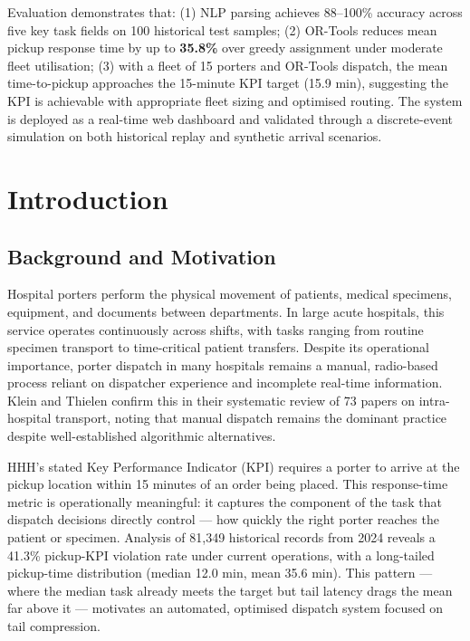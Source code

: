 \documentclass[12pt,a4paper]{article}
\begin{document}
Evaluation demonstrates that: (1) NLP parsing achieves 88--100\% accuracy across five key task fields on 100 historical test samples; (2) OR-Tools reduces mean pickup response time by up to \textbf{35.8\%} over greedy assignment under moderate fleet utilisation; (3) with a fleet of 15 porters and OR-Tools dispatch, the mean time-to-pickup approaches the 15-minute KPI target (15.9 min), suggesting the KPI is achievable with appropriate fleet sizing and optimised routing. The system is deployed as a real-time web dashboard and validated through a discrete-event simulation on both historical replay and synthetic arrival scenarios.

\newpage
\tableofcontents
\newpage

\section{Introduction}

\subsection{Background and Motivation}

Hospital porters perform the physical movement of patients, medical specimens, equipment, and documents between departments. In large acute hospitals, this service operates continuously across shifts, with tasks ranging from routine specimen transport to time-critical patient transfers. Despite its operational importance, porter dispatch in many hospitals remains a manual, radio-based process reliant on dispatcher experience and incomplete real-time information. Klein and Thielen \cite{klein2025} confirm this in their systematic review of 73 papers on intra-hospital transport, noting that manual dispatch remains the dominant practice despite well-established algorithmic alternatives.

HHH's stated Key Performance Indicator (KPI) requires a porter to arrive at the pickup location within 15 minutes of an order being placed. This response-time metric is operationally meaningful: it captures the component of the task that dispatch decisions directly control --- how quickly the right porter reaches the patient or specimen. Analysis of 81,349 historical records from 2024 reveals a 41.3\% pickup-KPI violation rate under current operations, with a long-tailed pickup-time distribution (median 12.0 min, mean 35.6 min). This pattern --- where the median task already meets the target but tail latency drags the mean far above it --- motivates an automated, optimised dispatch system focused on tail compression.
\end{document}
